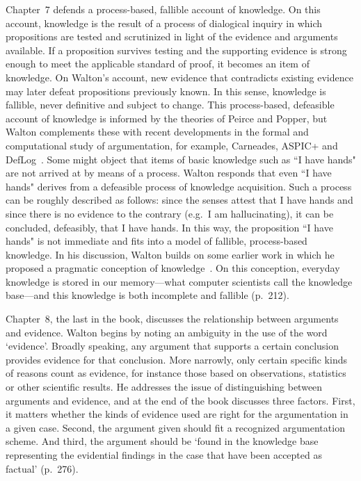 \documentclass[12pt,a4paper]{article}
\begin{document}
Chapter~7 defends a process-based, fallible account of knowledge. On
this account, knowledge is the result of a process of dialogical inquiry in which
propositions are tested and scrutinized in light of the evidence and arguments
available. If a proposition survives testing and the supporting evidence is
strong enough to meet the applicable standard of proof, it becomes an item of
knowledge. On Walton's account, new evidence that contradicts existing evidence 
may later defeat propositions previously known. In this sense, 
knowledge is fallible, never definitive and subject to change. 
This process-based, defeasible
account of knowledge is informed by the theories of Peirce and Popper,
but Walton complements these with recent developments in the formal and computational study of argumentation,
for example, Carneades, ASPIC+ and DefLog~\citep{gordonEtal2007,prakken2010,verheij2005}. 
Some might object that items of basic knowledge such as ``I have hands"
are not arrived at by means of a process. Walton responds that even ``I
have hands" derives from a defeasible process of knowledge
acquisition. Such a process can be roughly described as follows: 
since the senses attest that I have hands 
and since there is no evidence to the contrary (e.g.\ I am hallucinating), it can be concluded, defeasibly,
that I have hands. In this way, the proposition ``I have hands" is not immediate and fits into a model of fallible, process-based
knowledge. In his discussion, Walton builds on some earlier work in which he proposed a pragmatic 
conception of knowledge~\citep{walton2005knowledge}. On this conception, 
everyday knowledge is stored in our memory---what computer scientists 
call the knowledge base---and this knowledge is both incomplete 
and fallible (p.\ 212).

Chapter~8, the last in the book, discusses the relationship between
arguments and evidence. Walton begins by noting an ambiguity in the
use of the word `evidence'. Broadly speaking, any argument that
supports a certain conclusion provides evidence for that conclusion. More
narrowly, only certain specific kinds of reasons count as evidence, for instance those based on observations, statistics or other scientific results. He addresses the issue of distinguishing between arguments and evidence, and at the end of the book discusses three factors. First, it matters whether the kinds of evidence used are right for the argumentation in a given case. Second, the argument given should fit a recognized argumentation scheme. And third, the argument should be `found in the knowledge base representing the evidential findings in the case that have been accepted as factual'
(p.\ 276).
\end{document}

